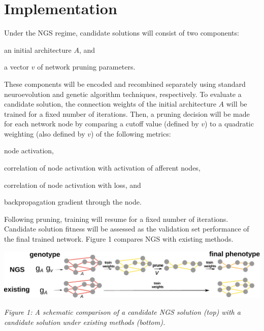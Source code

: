 \section{Implementation}

Under the NGS regime, candidate solutions will consist of two components:
\begin{enumerate*}[label=(\arabic*)]
\item an initial architecture $A$, and
\item a vector $v$ of network pruning parameters.
\end{enumerate*}
These components will be encoded and recombined separately using standard neuroevolution and genetic algorithm techniques, respectively.
To evaluate a candidate solution, the connection weights of the initial architecture $A$ will be trained for a fixed number of iterations.
Then, a pruning decision will be made for each network node by comparing a cutoff value (defined by $v$) to a quadratic weighting (also defined by $v$) of the following metrics:
\begin{enumerate*}[label=(\alph*)]
\item node activation,
\item correlation of node activation with activation of afferent nodes,
\item correlation of node activation with loss, and
\item backpropagation gradient through the node.
\end{enumerate*}
Following pruning, training will resume for a fixed number of iterations. Candidate solution fitness will be assessed as the validation set performance of the final trained network.
Figure 1 compares NGS with existing methods.

\noindent
\begin{minipage}{0.8\textwidth}
 \includegraphics[width=\textwidth]{img/complete}
\end{minipage}%
\begin{minipage}{0.2\textwidth}
  {
  \begin{footnotesize}
    \textit{
   Figure 1: A schematic comparison of a candidate NGS solution (top) with a candidate solution under existing methods (bottom).
   }
  \end{footnotesize}
  \par}
\end{minipage}

